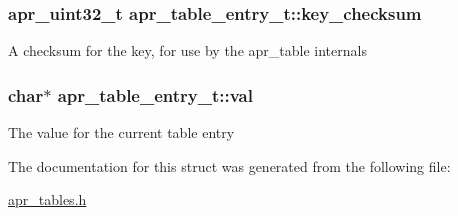 \subsubsection[{\texorpdfstring{key\+\_\+checksum}{key_checksum}}]{\setlength{\rightskip}{0pt plus 5cm}apr\+\_\+uint32\+\_\+t apr\+\_\+table\+\_\+entry\+\_\+t\+::key\+\_\+checksum}\hypertarget{structapr__table__entry__t_a0c51574420b6cc7bc6c2e35710e0ad3a}{}\label{structapr__table__entry__t_a0c51574420b6cc7bc6c2e35710e0ad3a}
A checksum for the key, for use by the apr\+\_\+table internals 
\subsubsection[{\texorpdfstring{val}{val}}]{\setlength{\rightskip}{0pt plus 5cm}char$\ast$ apr\+\_\+table\+\_\+entry\+\_\+t\+::val}\hypertarget{structapr__table__entry__t_a755371d0aa6a9487b502c34807271e6f}{}\label{structapr__table__entry__t_a755371d0aa6a9487b502c34807271e6f}
The value for the current table entry 

The documentation for this struct was generated from the following file\+:\begin{DoxyCompactItemize}
\item 
\hyperlink{apr__tables_8h}{apr\+\_\+tables.\+h}\end{DoxyCompactItemize}
